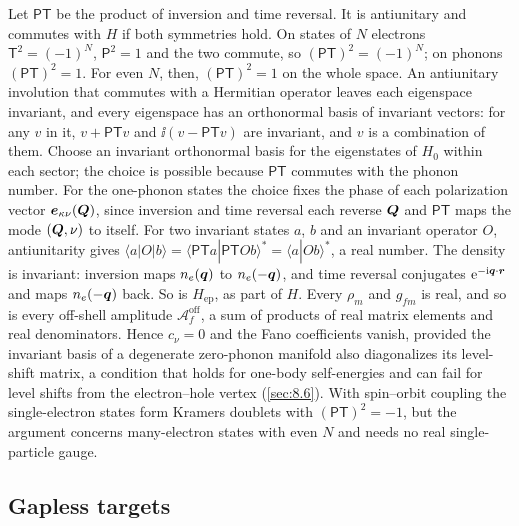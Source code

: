 Let $\mathsf{P}\mathsf{T}$ be the product of inversion and time reversal. It is antiunitary and commutes with $H$ if both symmetries hold. On states of $N$ electrons $\mathsf{T}^2 = (-1)^N$, $\mathsf{P}^2 = 1$ and the two commute, so $(\mathsf{P}\mathsf{T})^2 = (-1)^N$; on phonons $(\mathsf{P}\mathsf{T})^2 = 1$. For even $N$, then, $(\mathsf{P}\mathsf{T})^2 = 1$ on the whole space. An antiunitary involution that commutes with a Hermitian operator leaves each eigenspace invariant, and every eigenspace has an orthonormal basis of invariant vectors: for any $v$ in it, $v + \mathsf{P}\mathsf{T}v$ and $\ii(v - \mathsf{P}\mathsf{T}v)$ are invariant, and $v$ is a combination of them. Choose an invariant orthonormal basis for the eigenstates of $H_0$ within each sector; the choice is possible because $\mathsf{P}\mathsf{T}$ commutes with the phonon number. For the one-phonon states the choice fixes the phase of each polarization vector $\bm{e}_{\kappa\nu}(\bm{Q})$, since inversion and time reversal each reverse $\bm{Q}$ and $\mathsf{P}\mathsf{T}$ maps the mode $(\bm{Q}, \nu)$ to itself. For two invariant states $a$, $b$ and an invariant operator $O$, antiunitarity gives $\langle a|O|b\rangle = \langle\mathsf{P}\mathsf{T}a|\mathsf{P}\mathsf{T}Ob\rangle^* = \langle a|Ob\rangle^*$, a real number. The density is invariant: inversion maps $n_e(\bm{q})$ to $n_e(-\bm{q})$, and time reversal conjugates $\mathrm{e}^{-\mathrm{i}\bm{q}\cdot\bm{r}}$ and maps $n_e(-\bm{q})$ back. So is $H_{\mathrm{ep}}$, as part of $H$. Every $\rho_m$ and $g_{fm}$ is real, and so is every off-shell amplitude $\mathcal{A}^{\mathrm{off}}_f$, a sum of products of real matrix elements and real denominators. Hence $c_\nu = 0$ and the Fano coefficients vanish, provided the invariant basis of a degenerate zero-phonon manifold also diagonalizes its level-shift matrix, a condition that holds for one-body self-energies and can fail for level shifts from the electron--hole vertex (\cref{sec:8.6}). With spin--orbit coupling the single-electron states form Kramers doublets with $(\mathsf{P}\mathsf{T})^2 = -1$, but the argument concerns many-electron states with even $N$ and needs no real single-particle gauge.

\subsection{Gapless targets}


